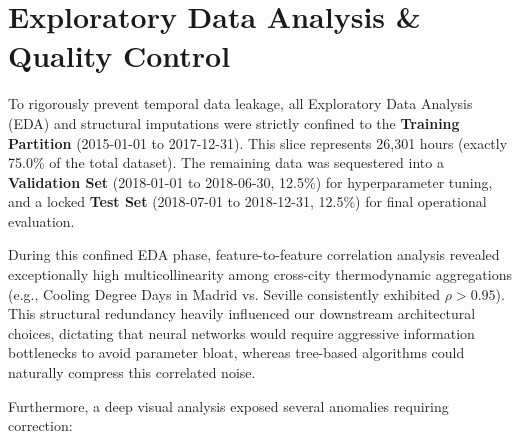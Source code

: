 \documentclass{article}
\begin{document}
\section{Exploratory Data Analysis \& Quality Control}

To rigorously prevent temporal data leakage, all Exploratory Data Analysis (EDA) and structural imputations were strictly confined to the \textbf{Training Partition} (2015-01-01 to 2017-12-31). This slice represents 26,301 hours (exactly 75.0\% of the total dataset). The remaining data was sequestered into a \textbf{Validation Set} (2018-01-01 to 2018-06-30, 12.5\%) for hyperparameter tuning, and a locked \textbf{Test Set} (2018-07-01 to 2018-12-31, 12.5\%) for final operational evaluation.

During this confined EDA phase, feature-to-feature correlation analysis revealed exceptionally high multicollinearity among cross-city thermodynamic aggregations (e.g., Cooling Degree Days in Madrid vs. Seville consistently exhibited $\rho > 0.95$). This structural redundancy heavily influenced our downstream architectural choices, dictating that neural networks would require aggressive information bottlenecks to avoid parameter bloat, whereas tree-based algorithms could naturally compress this correlated noise.

Furthermore, a deep visual analysis exposed several anomalies requiring correction:
\end{document}
